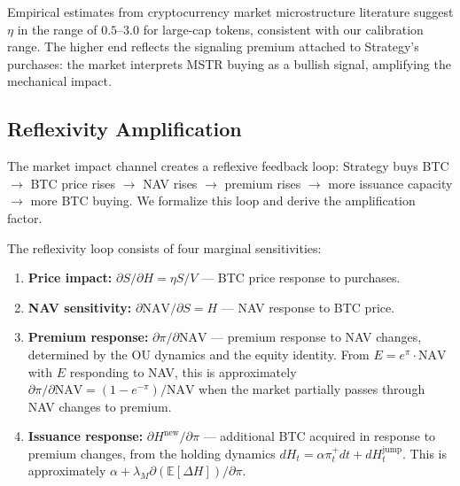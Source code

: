 \begin{remark}
Empirical estimates from cryptocurrency market microstructure literature
suggest $\eta$ in the range of $0.5$--$3.0$ for large-cap tokens,
consistent with our calibration range.  The higher end reflects the
signaling premium attached to Strategy's purchases: the market interprets
MSTR buying as a bullish signal, amplifying the mechanical impact.
\end{remark}

\subsection{Reflexivity Amplification}\label{subsec:reflexivity}

The market impact channel creates a reflexive feedback loop:
Strategy buys BTC $\to$ BTC price rises $\to$ NAV rises $\to$
premium rises $\to$ more issuance capacity $\to$ more BTC buying.
We formalize this loop and derive the amplification factor.

\begin{definition}\label{def:feedback_chain}
The reflexivity loop consists of four marginal sensitivities:
\begin{enumerate}
  \item \textbf{Price impact:} $\partial S / \partial H = \eta S / V$
    --- BTC price response to purchases.
  \item \textbf{NAV sensitivity:} $\partial \mathrm{NAV} / \partial S
    = H$ --- NAV response to BTC price.
  \item \textbf{Premium response:} $\partial \pi / \partial \mathrm{NAV}$
    --- premium response to NAV changes, determined by the OU dynamics
    and the equity identity.  From $E = e^\pi \cdot \mathrm{NAV}$ with
    $E$ responding to NAV, this is approximately
    $\partial \pi / \partial \mathrm{NAV}
    = (1 - e^{-\pi}) / \mathrm{NAV}$ when the market partially
    passes through NAV changes to premium.
  \item \textbf{Issuance response:}
    $\partial H^{\mathrm{new}} / \partial \pi$ --- additional BTC
    acquired in response to premium changes, from the holding dynamics
    $dH_t = \alpha \pi_t^+ dt + dH_t^{\mathrm{jump}}$.  This is
    approximately $\alpha + \lambda_M \partial(\mathbb{E}[\Delta H])
    / \partial \pi$.
\end{enumerate}
\end{definition}

